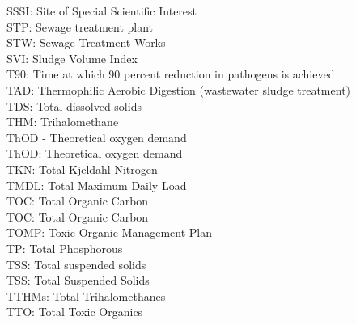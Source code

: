 \documentclass{article}
\begin{document}
SSSI:  Site of Special Scientific Interest
\vspace{0.3cm}\\
STP:  Sewage treatment plant
\vspace{0.3cm}\\
STW:  Sewage Treatment Works
\vspace{0.3cm}\\
SVI:  Sludge Volume Index
\vspace{0.3cm}\\
T90:  Time at which 90 percent reduction in pathogens is achieved
\vspace{0.3cm}\\
TAD:  Thermophilic Aerobic Digestion (wastewater sludge treatment)
\vspace{0.3cm}\\
TDS:  Total dissolved solids
\vspace{0.3cm}\\
THM:  Trihalomethane
\vspace{0.3cm}\\
ThOD - Theoretical oxygen demand
\vspace{0.3cm}\\
ThOD:  Theoretical oxygen demand
\vspace{0.3cm}\\
TKN: Total Kjeldahl Nitrogen
\vspace{0.3cm}\\
TMDL:  Total Maximum Daily Load
\vspace{0.3cm}\\
TOC:  Total Organic Carbon
\vspace{0.3cm}\\
TOC: Total Organic Carbon
\vspace{0.3cm}\\
TOMP: Toxic Organic Management Plan
\vspace{0.3cm}\\
TP:  Total Phosphorous 
\vspace{0.3cm}\\
TSS:  Total suspended solids 
\vspace{0.3cm}\\
TSS: Total Suspended Solids
\vspace{0.3cm}\\
TTHMs:  Total Trihalomethanes
\vspace{0.3cm}\\
TTO: Total Toxic Organics
\vspace{0.3cm}\\
\end{document}
